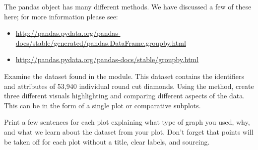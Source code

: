 The pandas  object has many different methods.
We have discussed a few of these here; for more information please see: 
\begin{itemize}
    \item \url{http://pandas.pydata.org/pandas-docs/stable/generated/pandas.DataFrame.groupby.html}
    \item \url{http://pandas.pydata.org/pandas-docs/stable/groupby.html}
\end{itemize}

\begin{problem} 
Examine the  dataset found in the  module. 
This dataset contains the identifiers and attributes of 53,940  individual round cut diamonds. 
Using the  method, create three different visuals highlighting and comparing different aspects of the data.
This can be in the form of a single plot or comparative subplots.

Print a few sentences for each plot explaining what type of graph you used, why, and what we learn about the dataset from your plot.
Don't forget that points will be taken off for each plot without a title, clear labels, and sourcing. 
\end{problem}

